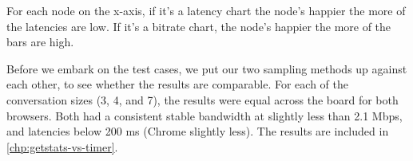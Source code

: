 For each node on the x-axis, if it's a latency chart the node's happier the more of the latencies are low. If it's a bitrate chart, the node's happier the more of the bars are high.

Before we embark on the test cases, we put our two sampling methods up against each other, to see whether the results are comparable. For each of the conversation sizes (3, 4, and 7), the results were equal across the board for both browsers. Both had a consistent stable bandwidth at slightly less than 2.1 Mbps, and latencies below 200 ms (Chrome slightly less). The results are included in \autoref{chp:getstats-vs-timer}.







